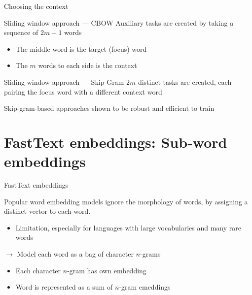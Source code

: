 \documentclass[12pt,aspectratio=169,handout]{beamer}
\begin{document}
\begin{frame}{Choosing the context}

\begin{block}{Sliding window approach --- CBOW}
Auxiliary tasks are created by taking a sequence of $2m + 1$ words
\begin{itemize}
	\item The middle word is the target (focus) word
	\item The $m$ words to each side is the context
\end{itemize}
\end{block}

\begin{block}{Sliding window approach --- Skip-Gram}
$2m$ distinct tasks are created, each pairing the focus word with a different context word
\end{block}	

Skip-gram-based approaches shown to be robust and efficient to train

\end{frame}

\section{FastText embeddings: Sub-word embeddings}

\begin{frame}{FastText embeddings}

Popular word embedding models ignore the morphology of words, by assigning a distinct vector to each word.
\begin{itemize}
\item Limitation, especially for languages with large vocabularies and many rare words
\end{itemize}

\pause

$\to$ Model each word as a bag of character $n$-grams
\begin{itemize}
\item Each character $n$-gram has own embedding
\item Word is represented as a sum of $n$-gram emeddings	
\end{itemize}



\end{frame}
\end{document}
